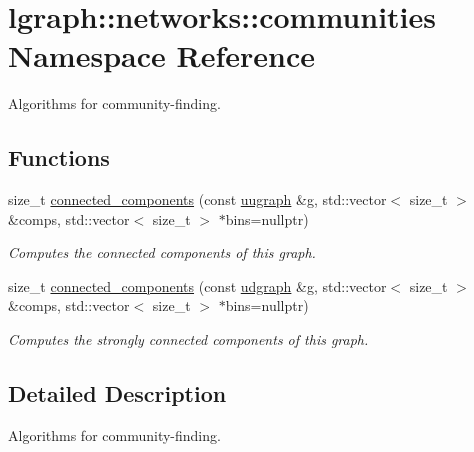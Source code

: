\hypertarget{namespacelgraph_1_1networks_1_1communities}{\section{lgraph\-:\-:networks\-:\-:communities Namespace Reference}
\label{namespacelgraph_1_1networks_1_1communities}
}


Algorithms for community-\/finding.  


\subsection*{Functions}
\begin{DoxyCompactItemize}
\item 
size\-\_\-t \hyperlink{namespacelgraph_1_1networks_1_1communities_a3d10fc5364fef994e881117c376e3513}{connected\-\_\-components} (const \hyperlink{classlgraph_1_1uugraph}{uugraph} \&g, std\-::vector$<$ size\-\_\-t $>$ \&comps, std\-::vector$<$ size\-\_\-t $>$ $\ast$bins=nullptr)
\begin{DoxyCompactList}\small\item\em Computes the connected components of this graph. \end{DoxyCompactList}\item 
size\-\_\-t \hyperlink{namespacelgraph_1_1networks_1_1communities_acd8a141ca593aee59fee06d4657c902a}{connected\-\_\-components} (const \hyperlink{classlgraph_1_1udgraph}{udgraph} \&g, std\-::vector$<$ size\-\_\-t $>$ \&comps, std\-::vector$<$ size\-\_\-t $>$ $\ast$bins=nullptr)
\begin{DoxyCompactList}\small\item\em Computes the strongly connected components of this graph. \end{DoxyCompactList}\end{DoxyCompactItemize}


\subsection{Detailed Description}
Algorithms for community-\/finding. 


